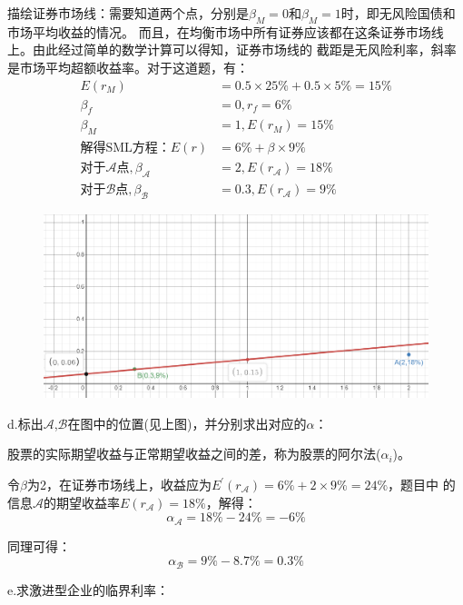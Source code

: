 \documentclass{article}
\begin{document}
描绘证券市场线：需要知道两个点，分别是$\beta_M=0$和$\beta_M=1$时，即无风险国债和市场平均收益的情况。
而且，在均衡市场中所有证券应该都在这条证券市场线上。由此经过简单的数学计算可以得知，证券市场线的
截距是无风险利率，斜率是市场平均超额收益率。对于这道题，有：
\begin{align}
    E(r_M)&=0.5\times 25\%+0.5\times 5\%=15\%\\
    \beta_f&=0,r_f=6\%\\
    \beta_M&=1,E(r_M)=15\%\\
    \text{解得SML方程：}E(r)&=6\%+\beta\times 9\%\\
    \text{对于}\mathcal{A} \text{点},\beta_\mathcal{A} &=2,E(r_\mathcal{A} )=18\%\\
    \text{对于}\mathcal{B} \text{点},\beta_\mathcal{B} &=0.3,E(r_\mathcal{A} )=9\%
\end{align}
\begin{figure}[H]
    \begin{center}
        \includegraphics[width=1\textwidth]{1.png}
    \end{center}
\end{figure}

d.标出$\mathcal{A} $,$\mathcal{B} $在图中的位置(见上图)，并分别求出对应的$\alpha$：

股票的实际期望收益与正常期望收益之间的差，称为股票的阿尔法($\alpha_i$)。

令$\beta$为2，在证券市场线上，收益应为$E^{\prime}(r_\mathcal{A} )=6\%+2\times 9\%=24\%$，题目中
的信息$\mathcal{A} $的期望收益率$E(r_\mathcal{A} )=18\%$，解得：
\[\alpha_\mathcal{A} =18\%-24\%=-6\%\]

同理可得：
\[\alpha_\mathcal{B} =9\%-8.7\%=0.3\%\]

e.求激进型企业的临界利率：
\end{document}

